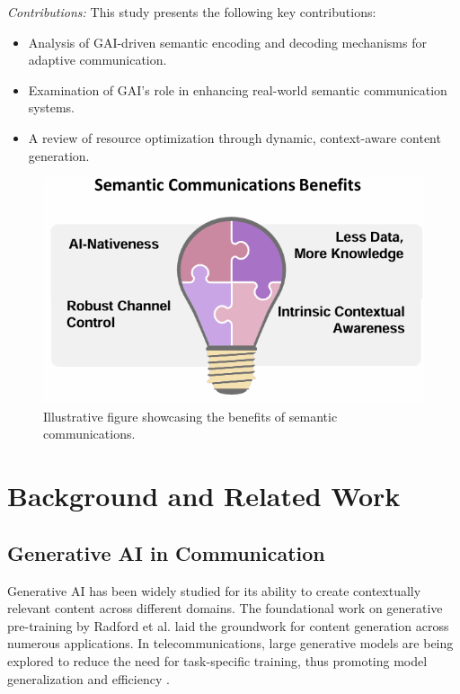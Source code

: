 \documentclass[journal]{IEEEtran}
\begin{document}
\textit{Contributions:} This study presents the following key contributions:
\begin{itemize}
    \item Analysis of GAI-driven semantic encoding and decoding mechanisms for adaptive communication.
    \item Examination of GAI’s role in enhancing real-world semantic communication systems.
    \item A review of resource optimization through dynamic, context-aware content generation.
\end{itemize}

\begin{figure}[htbp]
    \centering
    \includegraphics[width=\linewidth]{1.png}
    \caption{Illustrative figure showcasing the benefits of semantic communications.\cite{chaccour2022dataknowledgebuildinggeneration}}
    \label{fig:semantic_benefits}
\end{figure}

\section{Background and Related Work}

\subsection{Generative AI in Communication}
Generative AI has been widely studied for its ability to create contextually relevant content across different domains. The foundational work on generative pre-training by Radford et al. \cite{Radford2018ImprovingLU} laid the groundwork for content generation across numerous applications. In telecommunications, large generative models are being explored to reduce the need for task-specific training, thus promoting model generalization and efficiency \cite{bariah2023largegenerativeaimodels,10614204}.
\end{document}
